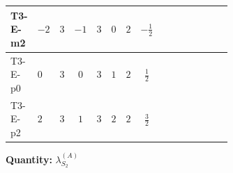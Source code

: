 \documentclass[8pt]{article}
\begin{document}
\begin{landscape}
\begin{longtable}{@{}llcccccc >{\raggedright\arraybackslash}p{0.21\linewidth} >{\raggedright\arraybackslash}p{0.21\linewidth} >{\raggedright\arraybackslash}p{0.21\linewidth}@{}}
\midrule
T3-E-m2 & $-2$ & $3$ & $-1$ & $3$ & $0$ & $2$ & $-\frac{1}{2}$ & \scriptsize\adjustbox{max width=\linewidth}{$\begin{gathered} +3 {\lambda_{HS_2}^{(A)}}^2\end{gathered}$} & \scriptsize\adjustbox{max width=\linewidth}{$\begin{gathered} +\frac{7 {\lambda_{S_2}^{(1)}}^2}{4}\end{gathered}$} & \scriptsize\adjustbox{max width=\linewidth}{$\begin{gathered} +22 {\lambda_{S_2}^{(A)}}^2\end{gathered}$} \\
\midrule
T3-E-p0 & $0$ & $3$ & $0$ & $3$ & $1$ & $2$ & $\frac{1}{2}$ & \scriptsize\adjustbox{max width=\linewidth}{$\begin{gathered} +3 {\lambda_{HS_2}^{(A)}}^2\end{gathered}$} & \scriptsize\adjustbox{max width=\linewidth}{$\begin{gathered} +\frac{7 {\lambda_{S_2}^{(1)}}^2}{4}\end{gathered}$} & \scriptsize\adjustbox{max width=\linewidth}{$\begin{gathered} +22 {\lambda_{S_2}^{(A)}}^2\end{gathered}$} \\
\midrule
T3-E-p2 & $2$ & $3$ & $1$ & $3$ & $2$ & $2$ & $\frac{3}{2}$ & \scriptsize\adjustbox{max width=\linewidth}{$\begin{gathered} +3 {\lambda_{HS_2}^{(A)}}^2\end{gathered}$} & \scriptsize\adjustbox{max width=\linewidth}{$\begin{gathered} +\frac{7 {\lambda_{S_2}^{(1)}}^2}{4}\end{gathered}$} & \scriptsize\adjustbox{max width=\linewidth}{$\begin{gathered} +22 {\lambda_{S_2}^{(A)}}^2\end{gathered}$} \\
\midrule
\bottomrule
\end{longtable}
\clearpage
\noindent\textbf{Quantity: }$\lambda_{S_2}^{(A)}$\par\smallskip

\end{landscape}
\end{document}

